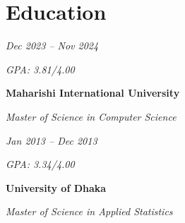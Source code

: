 
        
        \section{Education}

        \begin{twocolentry}{
            \textit{Dec 2023 – Nov 2024}

            \textit{GPA: 3.81/4.00}}
            \textbf{Maharishi International University}
        
            \textit{Master of Science in Computer Science}
        \end{twocolentry}
        
        
        \vspace{0.2 cm}
        
        \begin{twocolentry}{
            \textit{Jan 2013 – Dec 2013}
            
            \textit{GPA: 3.34/4.00}}
            \textbf{University of Dhaka}
        
            \textit{Master of Science in Applied Statistics}
        \end{twocolentry}
        
        
